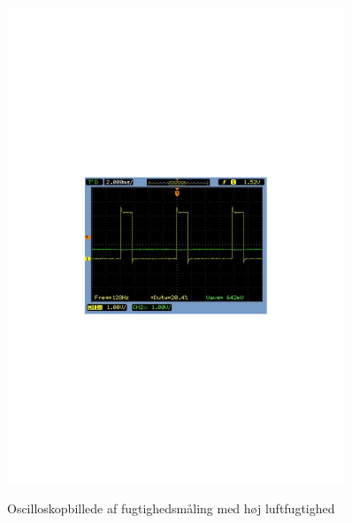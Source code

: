 \begin{figure}[H]
\centering
{\includegraphics[width=0.90\textwidth]{filer/modultest/Billeder/SCOP_tempKOLD}}
\caption{Oscilloskopbillede af fugtighedsmåling med høj luftfugtighed}
\label{lab:SCOP_TEMP_KOLD}
\end{figure}

